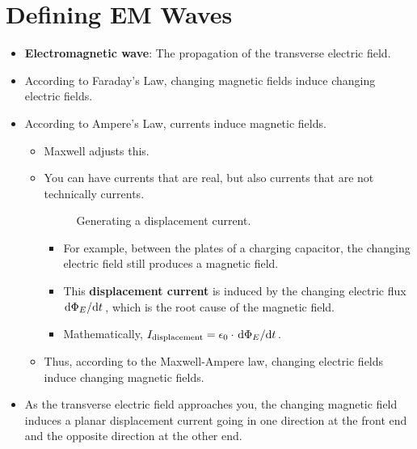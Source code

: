 \documentclass[../notes.tex]{subfiles}
\begin{document}
\section{Defining EM Waves}
\begin{itemize}
    \item \textbf{Electromagnetic wave}: The propagation of the transverse electric field.
    \item According to Faraday's Law, changing magnetic fields induce changing electric fields.
    \item According to Ampere's Law, currents induce magnetic fields.
    \begin{itemize}
        \item Maxwell adjusts this.
        \item You can have currents that are real, but also currents that are not technically currents.
        \begin{figure}[H]
            \centering
            \caption{Generating a displacement current.}
            \label{fig:displacementCurrent}
        \end{figure}
        \begin{itemize}
            \item For example, between the plates of a charging capacitor, the changing electric field still produces a magnetic field.
            \item This \textbf{displacement current} is induced by the changing electric flux $\dv*{\Phi_E}{t}$, which is the root cause of the magnetic field.
            \item Mathematically, $I_\text{displacement}=\epsilon_0\cdot\dv*{\Phi_E}{t}$.
        \end{itemize}
        \item Thus, according to the Maxwell-Ampere law, changing electric fields induce changing magnetic fields.
    \end{itemize}
    \item As the transverse electric field approaches you, the changing magnetic field induces a planar displacement current going in one direction at the front end and the opposite direction at the other end.
    \begin{figure}[h!]
        \centering
\end{figure}
\end{itemize}
\end{document}
